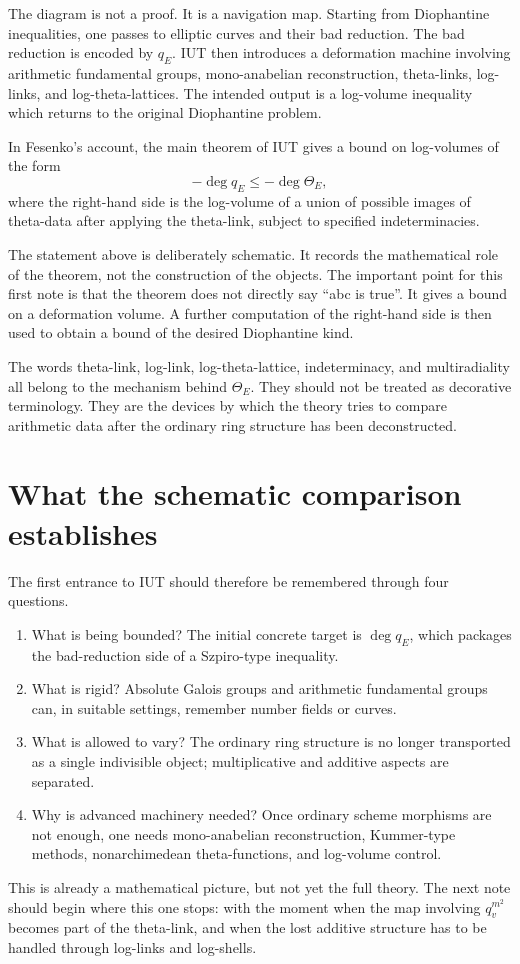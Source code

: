 The diagram is not a proof.  It is a navigation map.  Starting from Diophantine inequalities, one passes to elliptic curves and their bad reduction.  The bad reduction is encoded by \(q_E\).  IUT then introduces a deformation machine involving arithmetic fundamental groups, mono-anabelian reconstruction, theta-links, log-links, and log-theta-lattices.  The intended output is a log-volume inequality which returns to the original Diophantine problem.

\begin{theorem}
In Fesenko's account, the main theorem of IUT gives a bound on log-volumes of the form
\[
  -\deg q_E\leq -\deg \Theta_E,
\]
where the right-hand side is the log-volume of a union of possible images of theta-data after applying the theta-link, subject to specified indeterminacies.
\end{theorem}

The statement above is deliberately schematic.  It records the mathematical role of the theorem, not the construction of the objects.  The important point for this first note is that the theorem does not directly say ``abc is true''.  It gives a bound on a deformation volume.  A further computation of the right-hand side is then used to obtain a bound of the desired Diophantine kind.

\begin{remark}
The words theta-link, log-link, log-theta-lattice, indeterminacy, and multiradiality all belong to the mechanism behind \(\Theta_E\).  They should not be treated as decorative terminology.  They are the devices by which the theory tries to compare arithmetic data after the ordinary ring structure has been deconstructed.
\end{remark}

\section{What the schematic comparison establishes}

The first entrance to IUT should therefore be remembered through four questions.

\begin{enumerate}
  \item What is being bounded?  The initial concrete target is \(\deg q_E\), which packages the bad-reduction side of a Szpiro-type inequality.
  \item What is rigid?  Absolute Galois groups and arithmetic fundamental groups can, in suitable settings, remember number fields or curves.
  \item What is allowed to vary?  The ordinary ring structure is no longer transported as a single indivisible object; multiplicative and additive aspects are separated.
  \item Why is advanced machinery needed?  Once ordinary scheme morphisms are not enough, one needs mono-anabelian reconstruction, Kummer-type methods, nonarchimedean theta-functions, and log-volume control.
\end{enumerate}

This is already a mathematical picture, but not yet the full theory.  The next note should begin where this one stops: with the moment when the map involving \(q_v^{m^2}\) becomes part of the theta-link, and when the lost additive structure has to be handled through log-links and log-shells.

